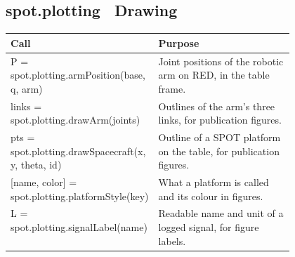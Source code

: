 \documentclass[11pt,a4paper]{article}
\begin{document}
\subsection*{spot.plotting \textmd{\textendash\ Drawing}}
\begin{xltabular}{\linewidth}{@{}>{\raggedright\arraybackslash\ttfamily\footnotesize}p{0.47\linewidth} >{\raggedright\arraybackslash\small}X@{}}
\toprule \normalfont\small\textbf{Call} & \textbf{Purpose} \\ \midrule \endhead
P = spot.plotting.armPosition(base, q, arm) & Joint positions of the robotic arm on RED, in the table frame. \\
links = spot.plotting.drawArm(joints) & Outlines of the arm's three links, for publication figures. \\
pts = spot.plotting.drawSpacecraft(x, y, theta, id) & Outline of a SPOT platform on the table, for publication figures. \\
{}[name, color] = spot.plotting.platformStyle(key) & What a platform is called and its colour in figures. \\
L = spot.plotting.signalLabel(name) & Readable name and unit of a logged signal, for figure labels. \\
\bottomrule\end{xltabular}
\end{document}
